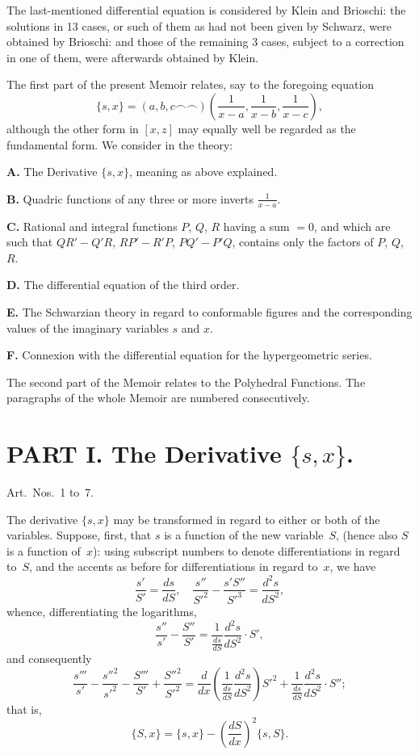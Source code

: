 \documentclass[11pt,a4paper]{book}
\begin{document}
\normalsize


The last-mentioned differential equation is considered by Klein and Brioschi:
the solutions in 13 cases, or such of them as had not been given by Schwarz,
were obtained by Brioschi: and those of the remaining 3 cases, subject to
a correction in one of them, were afterwards obtained by Klein.

The first part of the present Memoir relates, say to the foregoing equation
\[
\{s, x\} = (a, b, c \frown \frown) \left(\frac{1}{x-a}, \frac{1}{x-b}, \frac{1}{x-c}\right),
\]
although the other form in $[x, z]$ may equally well be regarded as the
fundamental form. We consider in the theory:

\textbf{A.} The Derivative $\{s, x\}$, meaning as above explained.

\textbf{B.} Quadric functions of any three or more inverts $\frac{1}{x-a}$.

\textbf{C.} Rational and integral functions $P$, $Q$, $R$ having a sum $=0$,
and which are such that $QR' - Q'R$, $RP' - R'P$, $PQ' - P'Q$, contains
only the factors of $P$, $Q$, $R$.

\textbf{D.} The differential equation of the third order.

\textbf{E.} The Schwarzian theory in regard to conformable figures and the
corresponding values of the imaginary variables $s$ and $x$.

\textbf{F.} Connexion with the differential equation for the hypergeometric
series.

The second part of the Memoir relates to the Polyhedral Functions.
The paragraphs of the whole Memoir are numbered consecutively.

\section*{PART I. The Derivative $\{s, x\}$.}

\begin{art}
Art.~Nos.~1 to~7.
\end{art}

\begin{art}
The derivative $\{s, x\}$ may be transformed in regard to either or both of
the variables. Suppose, first, that $s$ is a function of the new variable~$S$,
(hence also $S$ is a function of~$x$): using subscript numbers to denote
differentiations in regard to~$S$, and the accents as before for
differentiations in regard to~$x$, we have
\[
\frac{s'}{S'} = \frac{ds}{dS}, \quad
\frac{s''}{S'^2} - \frac{s'S''}{S'^3} = \frac{d^2s}{dS^2},
\]
whence, differentiating the logarithms,
\[
\frac{s''}{s'} - \frac{S''}{S'} = \frac{1}{\frac{ds}{dS}} \frac{d^2s}{dS^2} \cdot S',
\]
and consequently
\[
\frac{s'''}{s'} - \frac{s''^2}{s'^2} - \frac{S'''}{S'} + \frac{S''^2}{S'^2}
= \frac{d}{dx} \left(\frac{1}{\frac{ds}{dS}} \frac{d^2s}{dS^2}\right) S'^2
+ \frac{1}{\frac{ds}{dS}} \frac{d^2s}{dS^2} \cdot S'';
\]
that is,
\[
\{S, x\} = \{s, x\} - \left(\frac{dS}{dx}\right)^2 \{s, S\}.
\]
\end{art}
\end{document}

